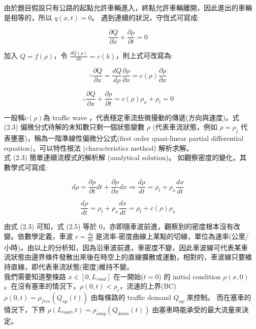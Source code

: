 \documentclass[a4paper, 11pt]{report}
\begin{document}
由於題目假設只有公路的起點允許車輛進入，終點允許車輛離開，因此進出的車輛是相等的，所以 $q(x,t) = 0$。 遇到連續的狀況，守恆式可寫成:

\begin{equation}
\frac{\partial Q}{\partial x}+\frac{\partial \rho}{\partial t}=0
\end{equation}

加入 $Q = f(\rho)$，令 $\frac{dQ(\rho)}{dk} = c(k)$，則上式可改寫為:

\begin{equation}
\because \frac{\partial Q}{\partial x}=\frac{dQ}{d\rho}\frac{\partial \rho}{\partial x} = c(\rho)\frac{\partial \rho}{\partial x}
\end{equation}

\begin{equation}
\therefore \frac{\partial Q}{\partial x}+\frac{\partial \rho}{\partial t}=c(\rho)\rho_x+\rho_t = 0
\end{equation}

一般稱$c(\rho)$為 traffic wave ，代表穩定車流些微擾動的傳遞(方向與速度)。式 (2.3) 偏微分式待解的未知數只剩一個狀態變數 $\rho$ (代表車流狀態，例如 $\rho = \rho_j$ 代表壅塞)，稱為一階準線性偏微分公式(first order quasi-linear partial
differential equation)，可以特性根法 (characteristics method) 解析求解。\\

式 (2.3) 簡單連續流模式的解析解 (analytical solution)。 如觀察密度的變化，其數學式可寫成:

\begin{equation}
d\rho = \frac{\partial \rho}{\partial t}dt+\frac{\partial \rho}{\partial x}dx⇒\frac{d\rho}{dt}=\rho_t+\rho_x\frac{dx}{dt}
\end{equation}

\begin{equation}
\frac{d\rho}{dt} = \rho_t+\rho_x\frac{dx}{dt}=\rho_t+c(\rho)\rho_x
\end{equation}

由式 (2.3) 可知，式 (2.5) 等於 0，亦即隨車波前進，觀察到的密度根本沒有改變。依數學定義，車波 $c = \frac{dq}{d\rho}$ 是流率-密度曲線上某點的切線，單位為速率(公里/小時)。由以上的分析知，因為沿車波前進，車密度不變，因此車波線可代表某車流狀態由邊界條件發散出來後在時空上的直線擴散或運動，相對的，車波線只要維持直線，即代表車流狀態(密度)維持不變。\\

我們需要知道整條路 $x \in [0, L_{road}]$ 在一開始($t = 0$) 的 initial condition $\rho(x,0)$。在沒有塞車的情況下，$\rho(0,t) < \rho_c$，流速的上界(BC) $\rho(0,t) = \rho_{free}(Q_{up}(t))$ 由每條路的 traffic demand $Q_{up}$ 來控制。 而在塞車的情況下，下界 $\rho(L_{road},t) = \rho_{cong}(Q_{down}(t))$ 由塞車時能承受的最大流量來決定。
\end{document}
